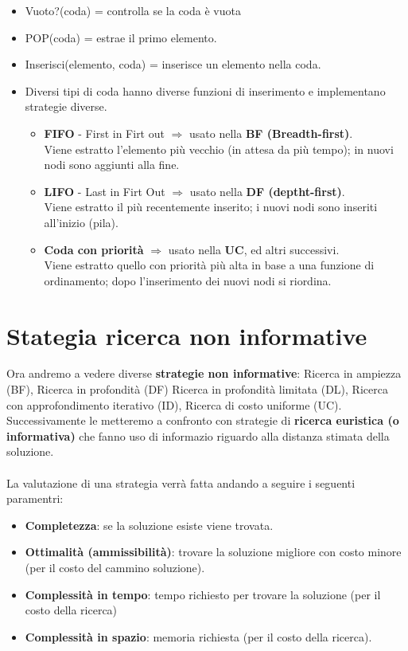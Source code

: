 \begin{itemize}
	\item Vuoto?(coda) = controlla se la coda è vuota
	\item POP(coda) = estrae il primo elemento.
	\item Inserisci(elemento, coda) = inserisce un elemento nella coda.
	\item Diversi tipi di coda hanno diverse funzioni di inserimento e implementano strategie diverse.
	\begin{itemize}
		\item \textbf{FIFO} - First in Firt out $\Longrightarrow$ usato nella \textbf{BF (Breadth-first)}.\\
		Viene estratto l’elemento più vecchio (in attesa da più tempo); in nuovi nodi sono aggiunti alla fine.
		\item \textbf{LIFO} - Last in Firt Out $\Longrightarrow$ usato nella \textbf{DF (deptht-first)}.\\
		Viene estratto il più recentemente inserito; i nuovi nodi sono inseriti all’inizio (pila).
		\item \textbf{Coda con priorità} $\Longrightarrow$ usato nella \textbf{UC}, ed altri successivi.\\
		Viene estratto quello con priorità più alta in base a una funzione di ordinamento; dopo l’inserimento dei nuovi nodi si riordina.
	\end{itemize}
\end{itemize}

\section{Stategia ricerca non informative}
Ora andremo a vedere diverse \textbf{strategie non informative}: Ricerca in ampiezza (BF), Ricerca in profondità (DF)
Ricerca in profondità limitata (DL), Ricerca con approfondimento iterativo (ID), Ricerca di costo uniforme (UC).
Successivamente le metteremo a confronto con strategie di \textbf{ricerca euristica (o informativa)} che fanno uso di informazio riguardo alla distanza
stimata della soluzione.\\\\
La valutazione di una strategia verrà fatta andando a seguire i seguenti paramentri:
\begin{itemize}
	\item \textbf{Completezza}: se la soluzione esiste viene trovata.
	\item \textbf{Ottimalità (ammissibilità)}: trovare la soluzione migliore con costo minore (per il costo del cammino soluzione).
	\item \textbf{Complessità in tempo}: tempo richiesto per trovare la soluzione (per il costo della ricerca)
	\item \textbf{Complessità in spazio}: memoria richiesta (per il costo della ricerca).
\end{itemize}

